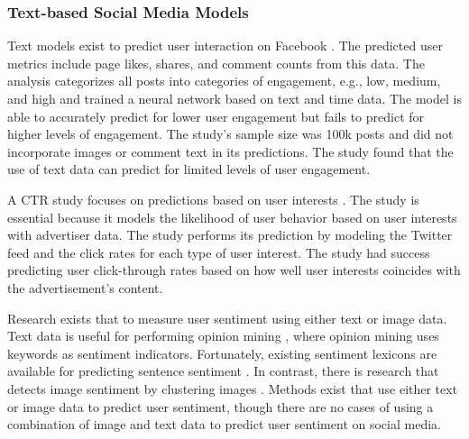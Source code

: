 \documentclass{article}
\begin{document}

\subsubsection{Text-based Social Media Models}
Text models exist to predict user interaction on Facebook \cite{8029313}. The predicted user metrics include page likes, shares, and comment counts from this data. The analysis categorizes all posts into categories of engagement, e.g., low, medium, and high and trained a neural network based on text and time data. The model is able to accurately predict for lower user engagement but fails to predict for higher levels of engagement. The study's sample size was 100k posts and did not incorporate images or comment text in its predictions. The study found that the use of text data can predict for limited levels of user engagement.

A CTR study focuses on predictions based on user interests \cite{Li2015}. The study is essential because it models the likelihood of user behavior based on user interests with advertiser data.  The study performs its prediction by modeling the Twitter feed and the click rates for each type of user interest. The study had success predicting user click-through rates based on how well user interests coincides with the advertisement's content.

Research exists that to measure user sentiment using either text or image data. Text data is useful for performing opinion mining \cite{Liu2012}, where opinion mining uses keywords as sentiment indicators. Fortunately, existing sentiment lexicons are available for predicting sentence sentiment \cite{Georgiou2015}. In contrast, there is research that detects image sentiment by clustering images \cite{Wang2015}. Methods exist that use either text or image data to predict user sentiment, though there are no cases of using a combination of image and text data to predict user sentiment on social media.
\end{document}
